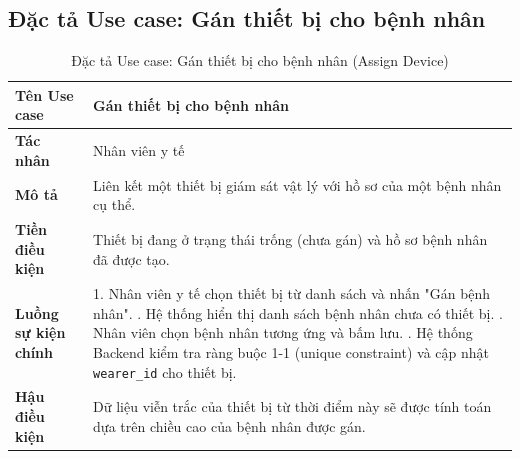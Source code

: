 \documentclass[../DoAn.tex]{subfiles}
\begin{document}
\subsection{Đặc tả Use case: Gán thiết bị cho bệnh nhân}
\begin{table}[H]
    \centering
    \caption{Đặc tả Use case: Gán thiết bị cho bệnh nhân (Assign Device)}
    \label{tab:uc_gan_thiet_bi}
    \begin{tabular}{|p{4cm}|p{10.5cm}|}
        \hline
        \textbf{Tên Use case} & \textbf{Gán thiết bị cho bệnh nhân} \\ \hline
        \textbf{Tác nhân} & Nhân viên y tế \\ \hline
        \textbf{Mô tả} & Liên kết một thiết bị giám sát vật lý với hồ sơ của một bệnh nhân cụ thể. \\ \hline
        \textbf{Tiền điều kiện} & Thiết bị đang ở trạng thái trống (chưa gán) và hồ sơ bệnh nhân đã được tạo. \\ \hline
        \textbf{Luồng sự kiện chính} &
        1. Nhân viên y tế chọn thiết bị từ danh sách và nhấn "Gán bệnh nhân". \newline
        2. Hệ thống hiển thị danh sách bệnh nhân chưa có thiết bị. \newline
        3. Nhân viên chọn bệnh nhân tương ứng và bấm lưu. \newline
        4. Hệ thống Backend kiểm tra ràng buộc 1-1 (unique constraint) và cập nhật \texttt{wearer\_id} cho thiết bị. \\ \hline
        \textbf{Hậu điều kiện} & Dữ liệu viễn trắc của thiết bị từ thời điểm này sẽ được tính toán dựa trên chiều cao của bệnh nhân được gán. \\ \hline
    \end{tabular}
\end{table}
\end{document}
